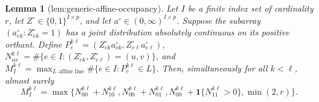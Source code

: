 \documentclass{article}
\newtheorem{lemma}{Lemma}
\begin{document}
\begin{lemma}[lem:generic-affine-occupancy]\label{lem:generic-affine-occupancy}
Let \(I\) be a finite index set of cardinality \(r\), let \(Z^\circ\in\{0,1\}^{I\times p}\), and let \(a^\circ\in(0,\infty)^{I\times p}\). Suppose the subarray \((a^\circ_{ek}:Z^\circ_{ek}=1)\) has a joint distribution absolutely continuous on its positive orthant. Define \(P_e^{k\ell}=(Z^\circ_{ek}a^\circ_{ek},Z^\circ_{e\ell}a^\circ_{e\ell})\), \(N_{uv}^{k\ell}=\#\{e\in I:(Z^\circ_{ek},Z^\circ_{e\ell})=(u,v)\}\), and \(M_I^{k\ell}=\max_{L\text{ affine line}}\#\{e\in I:P_e^{k\ell}\in L\}\). Then, simultaneously for all \(k<\ell\), almost surely
\[
 M_I^{k\ell}=\max\{N_{00}^{k\ell}+N_{10}^{k\ell},N_{00}^{k\ell}+N_{01}^{k\ell},N_{00}^{k\ell}+\mathbf 1\{N_{11}^{k\ell}>0\},\min(2,r)\}.
\]
\end{lemma}
\end{document}
